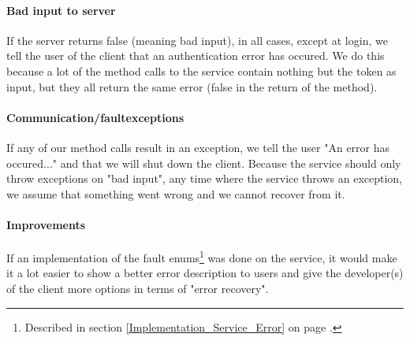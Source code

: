 \paragraph{Bad input to server} If the server returns false (meaning bad input), in all cases, except at login, we tell the user of the client that an authentication error has occured. We do this because a lot of the method calls to the service contain nothing but the token as input, but they all return the same error (false in the return of the method).

\paragraph{Communication/faultexceptions} If any of our method calls result in an exception, we tell the user "An error has occured..." and that we will shut down the client. Because the service should only throw exceptions on "bad input", any time where the service throws an exception, we assume that something went wrong and we cannot recover from it.

\paragraph{Improvements} If an implementation of the fault enums\footnote{Described in section \ref{Implementation_Service_Error} on page \pageref{Implementation_Service_Error}.} was done on the service, it would make it a lot easier to show a better error description to users and give the developer(s) of the client more options in terms of "error recovery".